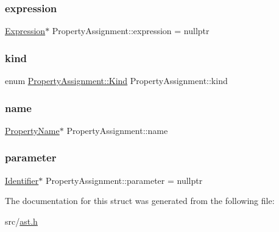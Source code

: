 \mbox{\label{struct_property_assignment_addee7ee5b0743c84303d1f3fad4a8a38}} 
\subsubsection{\texorpdfstring{expression}{expression}}
{\footnotesize\ttfamily \hyperlink{struct_expression}{Expression}$\ast$ Property\+Assignment\+::expression = nullptr}

\mbox{\label{struct_property_assignment_a7cb6c2f32adf600bb23564cfe6dc0463}} 
\subsubsection{\texorpdfstring{kind}{kind}}
{\footnotesize\ttfamily enum \hyperlink{struct_property_assignment_a123a67b3e1b5d04a4a34b8d528e9fc96}{Property\+Assignment\+::\+Kind}  Property\+Assignment\+::kind}

\mbox{\label{struct_property_assignment_a5e0dc6f37850bd4ae74b811f6548e376}} 
\subsubsection{\texorpdfstring{name}{name}}
{\footnotesize\ttfamily \hyperlink{struct_property_name}{Property\+Name}$\ast$ Property\+Assignment\+::name}

\mbox{\label{struct_property_assignment_a1f28fd75fe300211ee934a65d33650bc}} 
\subsubsection{\texorpdfstring{parameter}{parameter}}
{\footnotesize\ttfamily \hyperlink{struct_identifier}{Identifier}$\ast$ Property\+Assignment\+::parameter = nullptr}



The documentation for this struct was generated from the following file\+:\begin{DoxyCompactItemize}
\item 
src/\hyperlink{ast_8h}{ast.\+h}\end{DoxyCompactItemize}
